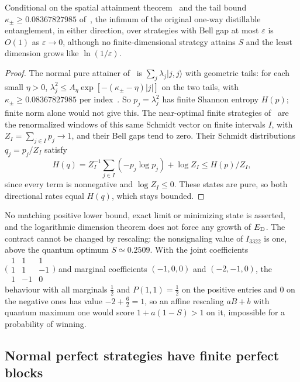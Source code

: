 \begin{theorem}\label{thm:i3322}
Conditional on the spatial attainment theorem~\cite[Theorem~2]{Dou26} and the tail bound $\kappa_\pm\ge0.08367827985$
of~\cite[Section~5.2]{Dou26}, the infimum of the original one-way distillable entanglement, in either direction, over strategies with Bell gap at most $\varepsilon$ is $O(1)$ as $\varepsilon\to0$, although no finite-dimensional strategy
attains $S$ and the least dimension grows like $\ln(1/\varepsilon)$.
\end{theorem}

\begin{proof}
The normal pure attainer of~\cite{Dou26} is $\sum_j\lambda_j|j,j\rangle$ with geometric tails: for each small $\eta>0$,
$\lambda_j^2\le A_\eta\exp[-(\kappa_\pm-\eta)|j|]$ on the two tails, with $\kappa_\pm\ge0.08367827985$ per index~\cite[Section~5.2]{Dou26}.
So $p_j=\lambda_j^2$ has finite Shannon entropy $H(p)$; finite norm alone would not give this. The near-optimal finite strategies
of~\cite[Section~5.2]{Dou26} are the renormalized windows of this same Schmidt vector on finite intervals $I$, with
$Z_I=\sum_{j\in I}p_j\to1$, and their Bell gaps tend to zero. Their Schmidt distributions $q_j=p_j/Z_I$ satisfy
\[
H(q)=Z_I^{-1}\sum_{j\in I}(-p_j\log p_j)+\log Z_I\le H(p)/Z_I,
\]
since every term is nonnegative and $\log Z_I\le0$. These states are pure, so both directional rates equal $H(q)$, which stays bounded.
\end{proof}

No matching positive lower bound, exact limit or minimizing state is asserted, and the logarithmic dimension theorem does not
force any growth of $E_{\mathrm D}$. The contract cannot be changed by rescaling: the nonsignaling value of $I_{3322}$ is one, above the
quantum optimum $S\simeq0.2509$. With the joint coefficients $\bigl(\begin{smallmatrix}1&1&1\\1&1&-1\\1&-1&0\end{smallmatrix}\bigr)$ and
marginal coefficients $(-1,0,0)$ and $(-2,-1,0)$, the behaviour with all marginals $\frac12$ and $P(1,1)=\frac12$ on the positive
entries and $0$ on the negative ones has value $-2+\frac62=1$, so an affine rescaling $aB+b$ with quantum maximum one would score
$1+a(1-S)>1$ on it, impossible for a probability of winning.

\subsection{Normal perfect strategies have finite perfect blocks}\label{sec:normal-perfect}

